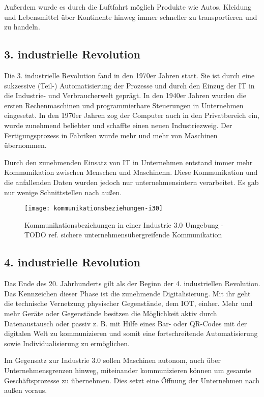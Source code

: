 Außerdem wurde es durch die Luftfahrt möglich Produkte wie Autos, Kleidung und Lebensmittel über Kontinente hinweg immer schneller zu transportieren und zu handeln.

\subsection{3. industrielle Revolution}

Die 3. industrielle Revolution fand in den 1970er Jahren statt. Sie ist durch eine sukzessive (Teil-) Automatisierung der Prozesse und durch den Einzug der IT in die Industrie- und Verbraucherwelt geprägt. In den 1940er Jahren wurden die ersten Rechenmaschinen und programmierbare Steuerungen in Unternehmen eingesetzt. In den 1970er Jahren zog der Computer auch in den Privatbereich ein, wurde zunehmend beliebter und schaffte einen neuen Industriezweig. Der Fertigungsprozess in Fabriken wurde mehr und mehr von Maschinen übernommen.

Durch den zunehmenden Einsatz von IT in Unternehmen entstand immer mehr Kommunikation zwischen Menschen und Maschinenn. Diese Kommunikation und die anfallenden Daten wurden jedoch nur unternehmensintern verarbeitet. Es gab nur wenige Schnittstellen nach außen.

\begin{figure}[h]
  \centering
  \texttt{[image: kommunikationsbeziehungen-i30]}
  \caption{Kommunikationsbeziehungen in einer Industrie 3.0 Umgebung - TODO ref. sichere unternehmensübergreifende Kommunikation}
  \label{Kap2:Industrie3.0-Kommunikation}
\end{figure}

\clearpage

\subsection{4. industrielle Revolution}

Das Ende des 20. Jahrhunderts gilt als der Beginn der 4. industriellen Revolution. Das Kennzeichen dieser Phase ist die zunehmende Digitalisierung. Mit ihr geht die technische Vernetzung physischer Gegenstände, dem \ac{IOT}, einher. Mehr und mehr Geräte oder Gegenstände besitzen die Möglichkeit aktiv durch Datenaustausch oder passiv z. B. mit Hilfe eines Bar- oder QR-Codes mit der digitalen Welt zu kommunizieren und somit eine fortschreitende Automatisierung sowie Individualisierung zu ermöglichen. 

Im Gegensatz zur Industrie 3.0 sollen Maschinen autonom, auch über Unternehmensgrenzen hinweg, miteinander kommunizieren können um gesamte Geschäftsprozesse zu übernehmen. Dies setzt eine Öffnung der Unternehmen nach außen voraus.

